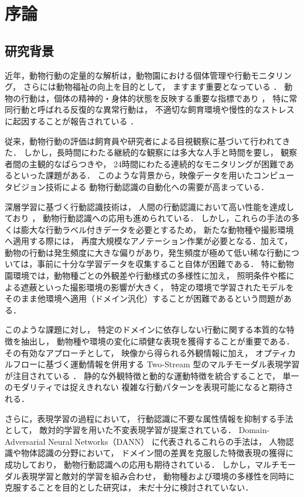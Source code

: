 \chapter{序論}

\section{研究背景}
近年，動物行動の定量的な解析は，動物園における個体管理や行動モニタリング，
さらには動物福祉の向上を目的として，
ますます重要となっている \cite{mellor2017updating}．
動物の行動は，個体の精神的・身体的状態を反映する重要な指標であり \cite{broom1986indicators}，
特に常同行動と呼ばれる反復的な異常行動は，
不適切な飼育環境や慢性的なストレスに起因することが報告されている \cite{mason1991stereotypies}．

従来，動物行動の評価は飼育員や研究者による目視観察に基づいて行われてきた．
しかし，長時間にわたる継続的な観察には多大な人手と時間を要し，
観察者間の主観的なばらつきや，
24時間にわたる連続的なモニタリングが困難であるといった課題がある．
このような背景から，映像データを用いたコンピュータビジョン技術による
動物行動認識の自動化への需要が高まっている．

深層学習に基づく行動認識技術は，
人間の行動認識において高い性能を達成しており \cite{carreira2017quo}，
動物行動認識への応用も進められている．
しかし，これらの手法の多くは膨大な行動ラベル付きデータを必要とするため，
新たな動物種や撮影環境へ適用する際には，
再度大規模なアノテーション作業が必要となる．加えて，動物の行動は発生頻度に大きな偏りがあり，発生頻度が極めて低い稀な行動については，事前に十分な学習データを収集すること自体が困難である．
特に動物園環境では，動物種ごとの外観差や行動様式の多様性に加え，
照明条件や檻による遮蔽といった撮影環境の影響が大きく，
特定の環境で学習されたモデルを
そのまま他環境へ適用（ドメイン汎化）することが困難であるという問題がある．

このような課題に対し，
特定のドメインに依存しない行動に関する本質的な特徴を抽出し，
動物種や環境の変化に頑健な表現を獲得することが重要である．
その有効なアプローチとして，
映像から得られる外観情報に加え，
オプティカルフローに基づく運動情報を併用する
Two-Stream 型のマルチモーダル表現学習が注目されている \cite{simonyan2014two}．
静的な外観特徴と動的な運動特徴を統合することで，
単一のモダリティでは捉えきれない
複雑な行動パターンを表現可能になると期待される．

さらに，表現学習の過程において，
行動認識に不要な属性情報を抑制する手法として，
敵対的学習を用いた不変表現学習が提案されている．
Domain-Adversarial Neural Networks（DANN）\cite{ganin2016domain} に代表されるこれらの手法は，
人物認識や物体認識の分野において，
ドメイン間の差異を克服した特徴表現の獲得に成功しており，
動物行動認識への応用も期待されている．
しかし，マルチモーダル表現学習と敵対的学習を組み合わせ，
動物種および環境の多様性を同時に克服することを目的とした研究は，
未だ十分に検討されていない．

